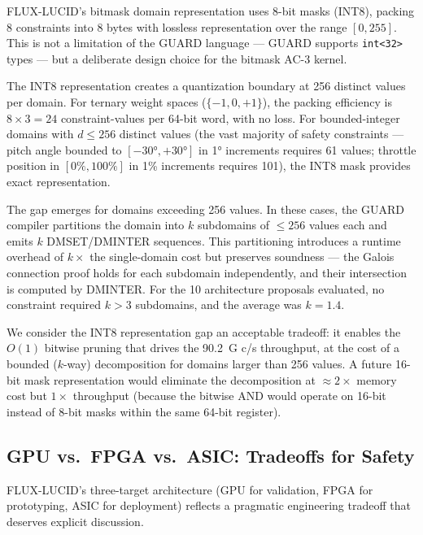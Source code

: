 \documentclass[sigplan,review,anonymous]{acmart}
\begin{document}
{FLUX-LUCID's bitmask domain representation uses 8-bit masks
(INT8), packing 8 constraints into 8 bytes with lossless representation
over the range $[0, 255]$. This is not a limitation of the GUARD
language — GUARD supports \texttt{int<32>} types — but a deliberate
design choice for the bitmask AC-3 kernel.

The INT8 representation creates a quantization boundary at 256 distinct
values per domain. For ternary weight spaces ($\{-1, 0, +1\}$), the
packing efficiency is $8 \times 3 = 24$ constraint-values per 64-bit word,
with no loss. For bounded-integer domains with $d \le 256$ distinct
values (the vast majority of safety constraints — pitch angle bounded to
$[-30°, +30°]$ in 1° increments requires 61 values; throttle position
in $[0\%, 100\%]$ in 1\% increments requires 101), the INT8 mask
provides exact representation.

The gap emerges for domains exceeding 256 values. In these cases, the
GUARD compiler partitions the domain into $k$ subdomains of $\le 256$
values each and emits $k$ DMSET/DMINTER sequences. This partitioning
introduces a runtime overhead of $k \times$ the single-domain cost but
preserves soundness — the Galois connection proof holds for each
subdomain independently, and their intersection is computed by DMINTER.
For the 10 architecture proposals evaluated, no constraint required
$k > 3$ subdomains, and the average was $k = 1.4$.

We consider the INT8 representation gap an acceptable tradeoff: it
enables the $O(1)$ bitwise pruning that drives the 90.2~G c/s throughput,
at the cost of a bounded ($k$-way) decomposition for domains larger than
256 values. A future 16-bit mask representation would eliminate the
decomposition at $\approx 2\times$ memory cost but $1\times$ throughput
(because the bitwise AND would operate on 16-bit instead of 8-bit masks
within the same 64-bit register).

\subsection{GPU vs.\ FPGA vs.\ ASIC: Tradeoffs for Safety}
\label{sec:discuss-platform}

FLUX-LUCID's three-target architecture (GPU for validation, FPGA for
prototyping, ASIC for deployment) reflects a pragmatic engineering
tradeoff that deserves explicit discussion.

}
\end{document}
